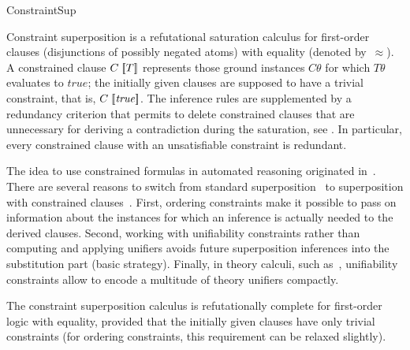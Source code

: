 \begin{entry}{ConstraintSup}

\begin{clarifications}
Constraint superposition is a refutational saturation calculus for
first-order clauses (disjunctions of possibly negated atoms)
with equality (denoted by~$\approx$).
A constrained clause $C\mathrel{[\kern-0.18em[T]\kern-0.18em]}$ represents those ground instances $C\theta$
for which $T\theta$ evaluates to $\mathit{true}$;
the initially given clauses are supposed to have a trivial
constraint, that is, $C\mathrel{[\kern-0.18em[\mathit{true}]\kern-0.18em]}$.
The inference rules are supplemented by a redundancy criterion
that permits to delete constrained clauses that are unnecessary for
deriving a contradiction during the saturation, see .
In particular, every constrained clause with an unsatisfiable
constraint is redundant.
\end{clarifications}

\begin{history}
The idea to use constrained formulas in automated reasoning
originated in~\cite{KirchnerKirchnerRusinowitch1990RFIA}.
There are several reasons to switch from
standard superposition~ to
superposition with constrained clauses~\cite{NieuwenhuisRubio1992ESOP,NieuwenhuisRubio1992CADE,NieuwenhuisRubio1995JSC}.
First,
ordering constraints
make it possible to pass on information about the instances
for which an inference is actually needed to the derived clauses.
Second,
working with unifiability constraints
rather than computing and applying unifiers
avoids future superposition inferences
into the substitution part
(basic strategy).
Finally, in theory calculi, such as~\cite{NieuwenhuisRubio1994CADE},
unifiability constraints allow
to encode a multitude of theory
unifiers compactly.

\end{history}

\begin{technicalities}
The constraint superposition calculus is refutationally complete for
first-order logic with equality,
provided that the initially given clauses have only trivial constraints
(for ordering constraints, this requirement can be relaxed slightly).
\end{technicalities}




\end{entry}
